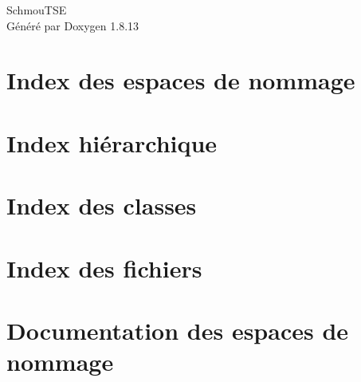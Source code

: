 \documentclass[twoside]{book}
\newcommand{\+}{\discretionary{\mbox{\scriptsize$\hookleftarrow$}}{}{}}
\newcommand{\clearemptydoublepage}{%
  \newpage{\pagestyle{empty}\cleardoublepage}%
}
\begin{document}
\hypersetup{pageanchor=false,
             bookmarksnumbered=true,
             pdfencoding=unicode
            }
\begin{titlepage}
\vspace*{7cm}
\begin{center}%
{\Large Schmou\textquotesingle{}T\+SE }\\
\vspace*{1cm}
{\large Généré par Doxygen 1.8.13}\\
\end{center}
\end{titlepage}
\clearemptydoublepage
{}
\tableofcontents
\clearemptydoublepage
{}
\hypersetup{pageanchor=true}

\chapter{Index des espaces de nommage}

\chapter{Index hiérarchique}

\chapter{Index des classes}

\chapter{Index des fichiers}

\chapter{Documentation des espaces de nommage}



\end{document}
